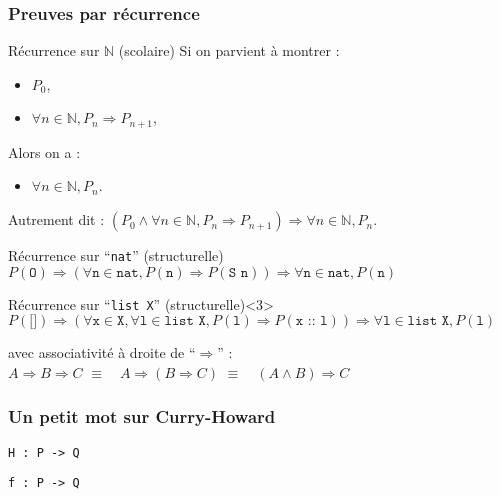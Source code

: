 \documentclass[9pt]{beamer}
\newenvironment{ex}[1][Exemple]{\begin{exampleblock}{#1}}{\end{exampleblock}}
\newenvironment{code}[1][Code]{\begin{block}{#1}}{\end{block}}
\newcommand{\N}{\mathbb{N}}
\begin{document}
\begin{frame}
\frametitle{Preuves par récurrence}

\begin{ex}[Récurrence sur $\N$ (scolaire)]
Si on parvient à montrer :
\begin{itemize}
 \item $P_0$,
 \item $\forall n \in \N, P_n \Rightarrow P_{n+1}$,
\end{itemize}
Alors on a :
\begin{itemize}
 \item $\forall n \in \N, P_n$.
\end{itemize}
Autrement dit : 
$(P_0 \wedge \forall n \in \N, P_n \Rightarrow P_{n+1}) \Rightarrow \forall n \in \N, P_n$.
\end{ex}

\pause
\begin{code}[Récurrence sur “\texttt{nat}” (structurelle)]
$P(\texttt{O}) \Rightarrow
  (\forall \texttt{n} \in \texttt{nat}, P(\texttt{n}) \Rightarrow P(\texttt{S n})) \Rightarrow
  \forall \texttt{n} \in \texttt{nat}, P(\texttt{n})$
\end{code}

\begin{code}[Récurrence sur “\texttt{list X}” (structurelle)]<3>
$P(\texttt{[]}) \Rightarrow
  (\forall \texttt{x} \in \texttt{X}, \forall \texttt{l} \in \texttt{list X}, P(\texttt{l}) \Rightarrow P(\texttt{x :: l})) \Rightarrow
  \forall \texttt{l} \in \texttt{list X}, P(\texttt{l})$
\end{code}

avec associativité à droite de “$\Rightarrow$” :
\\\quad$A \Rightarrow B \Rightarrow C$
\quad$\equiv\quad A \Rightarrow (B \Rightarrow C)$
\quad$\equiv\quad (A \wedge B) \Rightarrow C$
\end{frame}



\begin{frame}
\frametitle{Un petit mot sur Curry-Howard}

\huge

\begin{center}
\texttt{H : P -> Q}

\pause
\texttt{f : P -> Q}
\end{center}

\end{frame}
\end{document}
